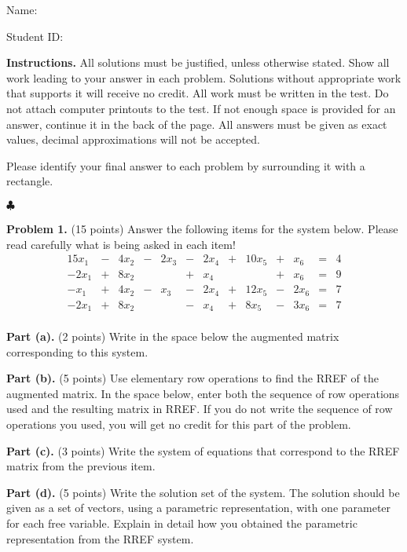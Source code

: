 \documentclass[12pt]{article}
\begin{document}
Name: \hrulefill

\bigskip
Student ID: \hrulefill

\bigskip
\textbf{Instructions.} All solutions must be justified, unless otherwise stated. Show all work leading to your answer in each problem. Solutions without appropriate work that supports it will receive no credit. All work must be written in the test. Do not attach computer printouts to the test. If not enough space is provided for an answer, continue it in the back of the page. All answers must be given as exact values, decimal approximations will not be accepted.

Please identify your final answer to each problem by surrounding it with a rectangle.

\vfill
\hfill$\clubsuit$

\clearpage

\textbf{Problem 1.} (15 points)
Answer the following items for the system below. Please read carefully what is being asked in each item!
\begin{alignat*}{15}
x_{1} &{}-{}& 4 x_{2} &{}-{}& 2 x_{3} &{}-{}& 2 x_{4} &{}+{}& 10 x_{5} &{}+{}& x_{6} &{}={}&4\\ 
- 2 x_{1} &{}+{}& 8 x_{2}&{}{}& &{}+{}& x_{4}&{}{}& &{}+{}& x_{6} &{}={}&9\\ 
- x_{1} &{}+{}& 4 x_{2} &{}-{}& x_{3} &{}-{}& 2 x_{4} &{}+{}& 12 x_{5} &{}-{}& 2 x_{6} &{}={}&7\\ 
- 2 x_{1} &{}+{}& 8 x_{2}&{}{}& &{}-{}& x_{4} &{}+{}& 8 x_{5} &{}-{}& 3 x_{6} &{}={}&7\\ 
\end{alignat*}

\textbf{Part (a).} (2 points) Write in the space below the augmented matrix corresponding to this system.

\vskip1.5in

\textbf{Part (b).} (5 points) Use elementary row operations to find the RREF of the augmented matrix. In the space below, enter both the sequence of row operations used and the resulting matrix in RREF. If you do not write the sequence of row operations you used, you will get no credit for this part of the problem.

\clearpage

\textbf{Part (c).} (3 points) Write the system of equations that correspond to the RREF matrix from the previous item.

\vskip2in

\textbf{Part (d).} (5 points) Write the solution set of the system. The solution should be given as a set of vectors, using a parametric representation, with one parameter for each free variable. Explain in detail how you obtained the parametric representation from the RREF system.
\end{document}
